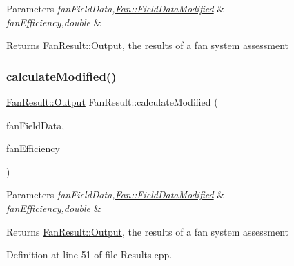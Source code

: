 \begin{DoxyParams}{Parameters}
{\em fan\+Field\+Data,\hyperlink{struct_fan_1_1_field_data_modified}{Fan\+::\+Field\+Data\+Modified}} & \\
\hline
{\em fan\+Efficiency,double} & \\
\hline
\end{DoxyParams}
\begin{DoxyReturn}{Returns}
\hyperlink{struct_fan_result_1_1_output}{Fan\+Result\+::\+Output}, the results of a fan system assessment 
\end{DoxyReturn}
\mbox{\label{class_fan_result_ac8b8ab301fca8ce4d37e6d4fbd44b9b9}} 
\subsubsection{\texorpdfstring{calculate\+Modified()}{calculateModified()}\hspace{0.1cm}{\footnotesize\ttfamily [2/3]}}
{\footnotesize\ttfamily \hyperlink{struct_fan_result_1_1_output}{Fan\+Result\+::\+Output} Fan\+Result\+::calculate\+Modified (\begin{DoxyParamCaption}\item[{\hyperlink{struct_fan_1_1_field_data_modified}{Fan\+::\+Field\+Data\+Modified} const \&}]{fan\+Field\+Data,  }\item[{double}]{fan\+Efficiency }\end{DoxyParamCaption})}


\begin{DoxyParams}{Parameters}
{\em fan\+Field\+Data,\hyperlink{struct_fan_1_1_field_data_modified}{Fan\+::\+Field\+Data\+Modified}} & \\
\hline
{\em fan\+Efficiency,double} & \\
\hline
\end{DoxyParams}
\begin{DoxyReturn}{Returns}
\hyperlink{struct_fan_result_1_1_output}{Fan\+Result\+::\+Output}, the results of a fan system assessment 
\end{DoxyReturn}


Definition at line 51 of file Results.\+cpp.

\mbox{\label{class_fan_result_a64173c80c723487b8a555250d22be459}} 

